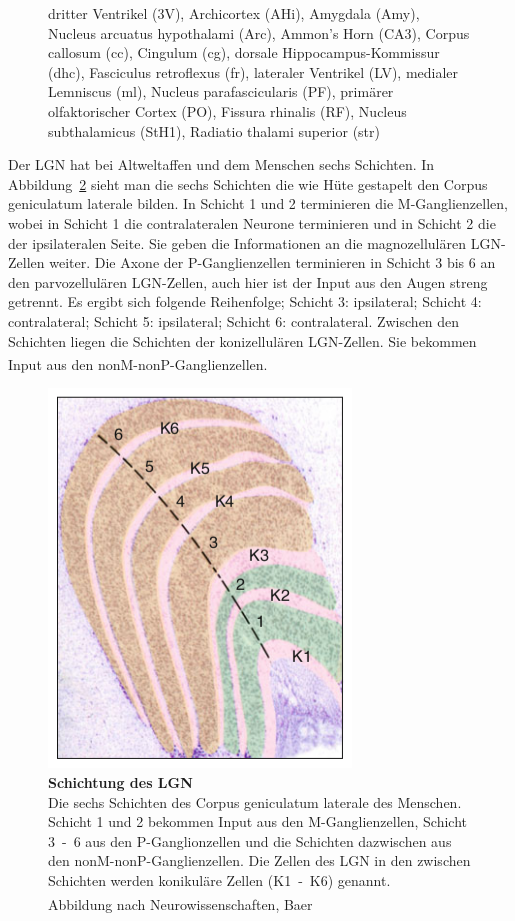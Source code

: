 \documentclass[12pt,a4paper,pdftex]{article}
\begin{document}
\begin{figure}[H]
{    dritter Ventrikel (3V), Archicortex (AHi), Amygdala (Amy), Nucleus arcuatus hypothalami (Arc), Ammon's Horn (CA3), Corpus callosum (cc), Cingulum (cg), dorsale Hippocampus-Kommissur (dhc), Fasciculus retroflexus (fr), lateraler Ventrikel (LV), medialer Lemniscus (ml), Nucleus parafascicularis (PF),  primärer  olfaktorischer  Cortex (PO), Fissura rhinalis (RF), Nucleus subthalamicus (StH1), Radiatio thalami superior (str)}
    \label{fig:LGN}
\end{figure}

Der LGN hat bei Altweltaffen und dem Menschen sechs Schichten. 
In Abbildung~\ref{fig:schichtung-LGN} sieht man die sechs Schichten die wie Hüte gestapelt den Corpus geniculatum laterale bilden. In Schicht 1 und 2 terminieren die M-Ganglienzellen, wobei in Schicht 1 die contralateralen Neurone terminieren und in Schicht 2 die der ipsilateralen Seite. Sie geben die Informationen an die magnozellulären LGN-Zellen weiter. Die Axone der P-Ganglienzellen terminieren in Schicht 3 bis 6 an den parvozellulären LGN-Zellen, auch hier ist der Input aus den Augen streng getrennt. Es ergibt sich folgende Reihenfolge; Schicht 3: ipsilateral; Schicht 4: contralateral; Schicht 5: ipsilateral; Schicht 6: contralateral.
Zwischen den Schichten liegen die Schichten der konizellulären LGN-Zellen. Sie bekommen Input aus den nonM-nonP-Ganglienzellen. \textsuperscript{\cite[9.7]{heldmaier2003tierphysiologie}}


\begin{figure}[H]
    \centering
    \includegraphics{pictures/visual/LGN_baer.png}
    \caption[Schichtung des LGN]{\textbf{Schichtung des LGN}\\
    Die sechs Schichten des Corpus geniculatum laterale des Menschen. Schicht 1 und 2 bekommen Input aus den M-Ganglienzellen, Schicht 3~-~6 aus den P-Ganglionzellen und die Schichten dazwischen aus den nonM-nonP-Ganglienzellen. Die Zellen des LGN in den zwischen Schichten werden konikuläre Zellen (K1~-~K6) genannt.\\
    Abbildung nach Neurowissenschaften, Baer \textsuperscript{\cite[10]{neurowissenschaften_baer}}}
    \label{fig:schichtung-LGN}
\end{figure} 
\end{document}
